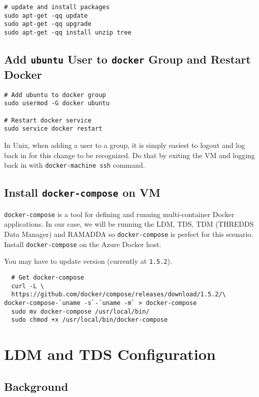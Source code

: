 \documentclass[onecolumn,9pt]{article}
\begin{document}
\begin{verbatim}
# update and install packages
sudo apt-get -qq update
sudo apt-get -qq upgrade
sudo apt-get -qq install unzip tree
\end{verbatim}

\subsection{\label{orgtarget6}Add \texttt{ubuntu} User to \texttt{docker} Group and Restart Docker}
\label{sec:orgheadline11}

\begin{verbatim}
# Add ubuntu to docker group
sudo usermod -G docker ubuntu

# Restart docker service
sudo service docker restart
\end{verbatim}


In Unix, when adding a user to a group, it is simply easiest to logout and log back in for this change to be recognized. Do that by exiting the VM and logging back in with \texttt{docker-machine ssh} command.


\subsection{Install \texttt{docker-compose} on VM}
\label{sec:orgheadline12}

\texttt{docker-compose} is a tool for defining and running multi-container Docker applications. In our case, we will be running the LDM, TDS, TDM (THREDDS Data Manager) and RAMADDA so \texttt{docker-compose} is perfect for this scenario. Install \texttt{docker-compose} on the Azure Docker host.

You may have to update version (currently at \texttt{1.5.2}).

\begin{verbatim}
  # Get docker-compose
  curl -L \
  https://github.com/docker/compose/releases/download/1.5.2/\
docker-compose-`uname -s`-`uname -m` > docker-compose
  sudo mv docker-compose /usr/local/bin/
  sudo chmod +x /usr/local/bin/docker-compose
\end{verbatim}

\section{LDM and TDS Configuration}
\label{sec:orgheadline29}
\subsection{Background}
\label{sec:orgheadline16}
\end{document}
